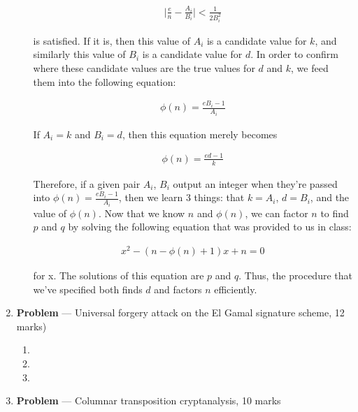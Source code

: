 \documentclass[11pt]{article}
\theoremstyle{definition}
\newcounter{problem}
\begin{document}
\begin{enumerate}
\begin{enumerate}
\begin{align*}
    \mid \frac{e}{n} - \frac{A_i}{B_i} \mid < \frac{1}{2B_i^2}
\end{align*}

is satisfied. If it is, then this value of $A_i$ is a candidate value for $k$, and similarly this value of $B_i$ is a candidate value for $d$. In order to confirm where these candidate values are the true values for $d$ and $k$, we feed them into the following equation:

\begin{align*}
    \phi(n) = \frac{eB_i - 1}{A_i}
\end{align*}

If $A_i = k$ and $B_i = d$, then this equation merely becomes

\begin{align*}
    \phi(n) = \frac{ed - 1}{k}
\end{align*}

Therefore, if a given pair $A_i$, $B_i$ output an integer when they're passed into $\phi(n) = \frac{eB_i - 1}{A_i}$, then we learn 3 things: that $k = A_i$, $d = B_i$, and the value of $\phi(n)$. Now that we know $n$ and $\phi(n)$, we can factor $n$ to find $p$ and $q$ by solving the following equation that was provided to us in class:

\begin{align*}
    x^2 - (n - \phi(n) + 1)x + n = 0
\end{align*}

for x. The solutions of this equation are $p$ and $q$. Thus, the procedure that we've specified both finds $d$ and factors $n$ efficiently.

\end{enumerate}

\newpage

\item[] \textbf{Problem \theproblem} --- Universal forgery attack on the El Gamal signature
    scheme, 12 marks)

\begin{enumerate}

\item %

\item %

\item %

\end{enumerate}

\newpage

 

\item[] \textbf{Problem \theproblem} --- Columnar transposition cryptanalysis, 10 marks

\end{enumerate}
\end{document}
